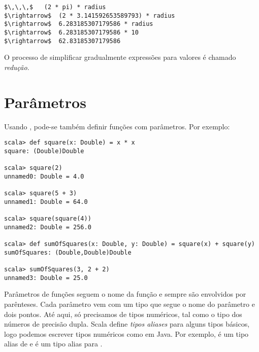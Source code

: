 \begin{lstlisting}
$\,\,\,$   (2 * pi) * radius
$\rightarrow$  (2 * 3.141592653589793) * radius
$\rightarrow$  6.283185307179586 * radius
$\rightarrow$  6.283185307179586 * 10
$\rightarrow$  62.83185307179586
\end{lstlisting}
O processo de simplificar gradualmente express\~{o}es para valores \'{e} 
chamado {\em redu\c{c}\~{a}o}.


\section{Par\^{a}metros}

Usando , pode-se tamb\'{e}m definir fun\c{c}\~{o}es com par\^{a}metros. Por exemplo:
\begin{lstlisting}
scala> def square(x: Double) = x * x
square: (Double)Double

scala> square(2)
unnamed0: Double = 4.0

scala> square(5 + 3)
unnamed1: Double = 64.0

scala> square(square(4))
unnamed2: Double = 256.0

scala> def sumOfSquares(x: Double, y: Double) = square(x) + square(y)
sumOfSquares: (Double,Double)Double

scala> sumOfSquares(3, 2 + 2)
unnamed3: Double = 25.0
\end{lstlisting}

Par\^{a}metros de fun\c{c}\~{o}es seguem o nome da fun\c{c}\~{a}o e sempre s\~{a}o envolvidos por
par\^{e}nteses. Cada par\^{a}metro vem com um tipo que segue o nome do par\^{a}metro
e dois pontos. At\'{e} aqui, s\'{o} precisamos de tipos num\'{e}ricos, tal como o tipo
 dos n\'{u}meros de precis\~{a}o dupla. Scala define {\em tipos
aliases} para alguns tipos b\'{a}sicos, logo podemos escrever tipos num\'{e}ricos 
como em Java. Por exemplo,  \'{e} um tipo alias de 
e  \'{e} um tipo alias para .       


